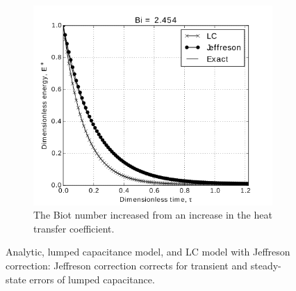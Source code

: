 \begin{figure}
        \begin{subfigure}[b]{0.5\textwidth}
                \includegraphics[width=\textwidth]{figures/LC-JC-analytic-sphere-in-fluid-Bi-2b}
                \caption{The Biot number increased from  an increase in the heat transfer coefficient.}
				\label{fig:LC-JC-analytic-sphere-in-fluid-Bi-2b}
        \end{subfigure}
        \caption[Jeffreson correction for moderate Biot number based on conductivity]{Analytic, lumped capacitance model, and LC model with Jeffreson correction: Jeffreson correction corrects for transient and steady-state errors of lumped capacitance.}\label{fig:LC-JC-analytic-sphere-in-fluid-Bi-2}
\end{figure}

